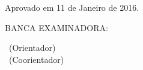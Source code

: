 %
% 
%
\begin{folhadeaprovacao}
  \begin{center}
  {\ABNTEXchapterfont\large\imprimirautor}

  \vspace*{\fill}\vspace*{\fill}
    \begin{center}
    	\ABNTEXchapterfont\bfseries\Large\imprimirtitulo
    \end{center}
  \vspace*{\fill}

  \hspace{.45\textwidth}
    \begin{minipage}{.5\textwidth}
    	\imprimirpreambulo 
    \end{minipage}%

  \vspace*{\fill}
    \begin{flushleft}
  	  Aprovado em 11 de Janeiro de 2016. \\
    \end{flushleft}
  \vspace*{\fill}
    BANCA EXAMINADORA:%
  \end{center}
   
     
    \vspace*{\fill} \vspace*{\fill}
    \hspace{.4\textwidth}
    \begin{minipage}{.5\textwidth}
    	\imprimirorientador~(Orientador) \\
        \imprimircoorientador~(Coorientador)
    \end{minipage}%
    

\end{folhadeaprovacao}
